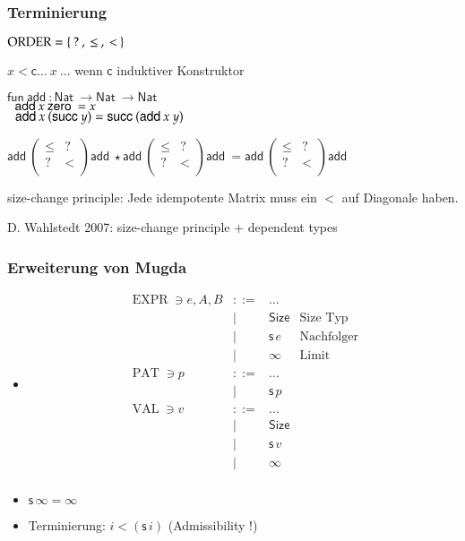 \documentclass[12pt,red,serif,mathserif]{beamer}
\newcommand{\s}{\mathsf{s}\,}
\newcommand{\Size}{\mathsf{Size}}
\newcommand{\fun}{\mathsf{fun}\:}
\newcommand{\Nat}{\mathsf{Nat}\:}
\newcommand{\zero}{\mathsf{zero}\:}
\newcommand{\suc}{\mathsf{succ}\:}
\newcommand{\add}{\mathsf{add}\:}
\newenvironment{bsp}
{\begin{list}{}{
\setlength{\leftmargin}{0cm}
\setlength{\rightmargin}{0cm}
}\item}{
\end {list}
}
\newcommand{\ra}{\rightarrow}
\newcommand{\spc}{\hspace*{2mm}}
\newcommand{\cc}{\mathsf{c}}
\newcommand{\opn}[1]{\operatorname{#1}}
\newcommand{\Expr}{\opn{EXPR}}
\newcommand{\Val}{\opn{VAL}}
\newcommand{\Pat}{\opn{PAT}}
\begin{document}
\frame
{

\frametitle{Terminierung}

\begin{itemize}
\item
$\order = \{ \: ? \: , \: \leq \: , \: < \: \}$
\item
$ x < \cc \ldots \: x \: \ldots $ wenn $\cc$ induktiver Konstruktor 
\vspace*{0.2cm}
\item
\begin{bsp}
$\fun \add : \Nat \ra \Nat \ra \Nat$\\
$\spc \add x \: \zero = x $\\
$\spc \add x \: (\suc y) = \suc (\add x \: y)  $
\end{bsp}
\vspace*{0.2cm}
\item
$
\add\begin{pmatrix}
\leq & ? \\
?    & < \\
\end{pmatrix}\add
\star
\add\begin{pmatrix}
\leq & ? \\
?    & < \\
\end{pmatrix}\add
=
\add\begin{pmatrix}
\leq & ? \\
?    & < \\
\end{pmatrix}\add
$
\vspace*{0.2cm}
\item
size-change principle: Jede idempotente Matrix muss ein $<$ auf Diagonale haben.
\item
D. Wahlstedt 2007: size-change principle + dependent types
\end{itemize}

}

\frame
{

\frametitle{ Erweiterung von Mugda }

\begin{itemize}
\item
\[
\begin{array}{lrll}
\Expr \ni e,A,B & ::= & \ldots & \\
& \mid & \Size & \mbox{Size Typ} \\
& \mid & \s e  & \mbox{Nachfolger}\\ 
& \mid & \infty & \mbox{Limit}\\
\Pat \ni p & ::= & \ldots & \\
& \mid & \s p & \\
\Val \ni v & ::= & \ldots & \\
& \mid & \Size & \\
& \mid & \s v & \\
& \mid & \infty & \\
\end{array}
\]
\item
$\s \infty = \infty$ 
\item
Terminierung: $i < (\s i)$ (Admissibility !) 
\end{itemize}
}
\end{document}
